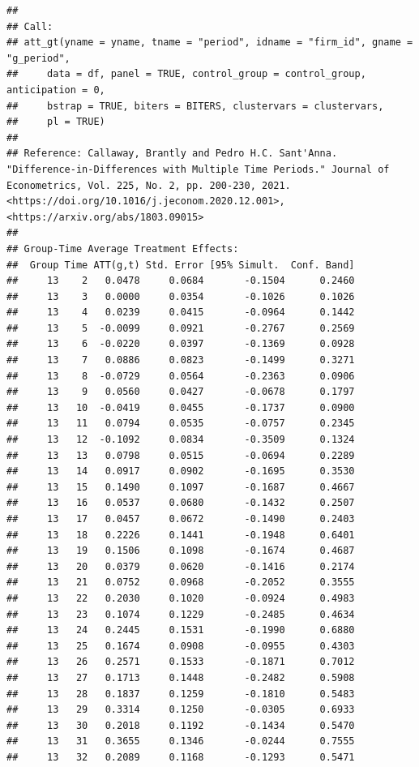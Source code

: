 \documentclass[
]{article}
\begin{document}
\begin{verbatim}
## 
## Call:
## att_gt(yname = yname, tname = "period", idname = "firm_id", gname = "g_period", 
##     data = df, panel = TRUE, control_group = control_group, anticipation = 0, 
##     bstrap = TRUE, biters = BITERS, clustervars = clustervars, 
##     pl = TRUE)
## 
## Reference: Callaway, Brantly and Pedro H.C. Sant'Anna.  "Difference-in-Differences with Multiple Time Periods." Journal of Econometrics, Vol. 225, No. 2, pp. 200-230, 2021. <https://doi.org/10.1016/j.jeconom.2020.12.001>, <https://arxiv.org/abs/1803.09015> 
## 
## Group-Time Average Treatment Effects:
##  Group Time ATT(g,t) Std. Error [95% Simult.  Conf. Band]  
##     13    2   0.0478     0.0684       -0.1504      0.2460  
##     13    3   0.0000     0.0354       -0.1026      0.1026  
##     13    4   0.0239     0.0415       -0.0964      0.1442  
##     13    5  -0.0099     0.0921       -0.2767      0.2569  
##     13    6  -0.0220     0.0397       -0.1369      0.0928  
##     13    7   0.0886     0.0823       -0.1499      0.3271  
##     13    8  -0.0729     0.0564       -0.2363      0.0906  
##     13    9   0.0560     0.0427       -0.0678      0.1797  
##     13   10  -0.0419     0.0455       -0.1737      0.0900  
##     13   11   0.0794     0.0535       -0.0757      0.2345  
##     13   12  -0.1092     0.0834       -0.3509      0.1324  
##     13   13   0.0798     0.0515       -0.0694      0.2289  
##     13   14   0.0917     0.0902       -0.1695      0.3530  
##     13   15   0.1490     0.1097       -0.1687      0.4667  
##     13   16   0.0537     0.0680       -0.1432      0.2507  
##     13   17   0.0457     0.0672       -0.1490      0.2403  
##     13   18   0.2226     0.1441       -0.1948      0.6401  
##     13   19   0.1506     0.1098       -0.1674      0.4687  
##     13   20   0.0379     0.0620       -0.1416      0.2174  
##     13   21   0.0752     0.0968       -0.2052      0.3555  
##     13   22   0.2030     0.1020       -0.0924      0.4983  
##     13   23   0.1074     0.1229       -0.2485      0.4634  
##     13   24   0.2445     0.1531       -0.1990      0.6880  
##     13   25   0.1674     0.0908       -0.0955      0.4303  
##     13   26   0.2571     0.1533       -0.1871      0.7012  
##     13   27   0.1713     0.1448       -0.2482      0.5908  
##     13   28   0.1837     0.1259       -0.1810      0.5483  
##     13   29   0.3314     0.1250       -0.0305      0.6933  
##     13   30   0.2018     0.1192       -0.1434      0.5470  
##     13   31   0.3655     0.1346       -0.0244      0.7555  
##     13   32   0.2089     0.1168       -0.1293      0.5471  

\end{verbatim}
\end{document}
